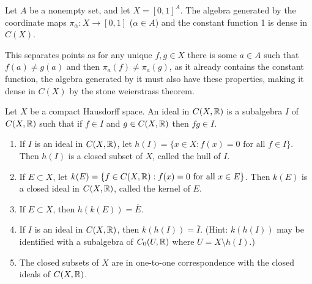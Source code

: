 \documentclass[12pt,a4paper]{article}
\begin{document}
\begin{problem}\label{prob:4-69}
Let $A$ be a nonempty set, and let $X = [0,1]^A$. The algebra generated by the coordinate maps $\pi_\alpha : X \to [0,1]$ ($\alpha \in A$) and the constant function 1 is dense in $C(X)$.
\end{problem}
\begin{solution}
This separates points as for any unique $f,g\in X$ there is some $a\in A$ such that $f(a)\neq g(a)$ and then $\pi_a(f)\neq\pi_a(g)$, as it already contains the constant function, the algebra generated by it must also have these properties, making it dense in $C(X)$ by the stone weierstrass theorem. 
\end{solution}
\begin{problem}\label{prob:4-70}
Let $X$ be a compact Hausdorff space. An ideal in $C(X,\mathbb{R})$ is a subalgebra $I$ of $C(X,\mathbb{R})$ such that if $f \in I$ and $g \in C(X,\mathbb{R})$ then $fg \in I$.
\begin{enumerate}[label=\alph*.]
    \item If $I$ is an ideal in $C(X,\mathbb{R})$, let $h(I) = \{x \in X : f(x) = 0 \text{ for all } f \in I\}$. Then $h(I)$ is a closed subset of $X$, called the hull of $I$.
    \item If $E \subset X$, let $k(E) = \{f \in C(X,\mathbb{R}) : f(x) = 0 \text{ for all } x \in E\}$. Then $k(E)$ is a closed ideal in $C(X,\mathbb{R})$, called the kernel of $E$.
    \item If $E \subset X$, then $h(k(E)) = \overline{E}$.
    \item If $I$ is an ideal in $C(X,\mathbb{R})$, then $k(h(I)) = \overline{I}$. (Hint: $k(h(I))$ may be identified with a subalgebra of $C_0(U,\mathbb{R})$ where $U = X \setminus h(I)$.)
    \item The closed subsets of $X$ are in one-to-one correspondence with the closed ideals of $C(X,\mathbb{R})$.
\end{enumerate}
\end{problem}
\end{document}
